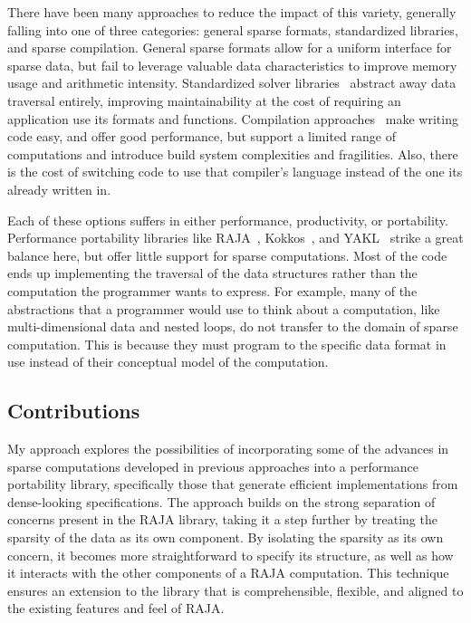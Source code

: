 There have been many approaches to reduce the impact of this variety, generally falling into one of three categories: general sparse formats, standardized libraries, and sparse compilation.
General sparse formats allow for a uniform interface for sparse data, but fail to leverage valuable data characteristics to improve memory usage and arithmetic intensity.
Standardized solver libraries~\cite{eisenstat1977yale,eisenstat1977yale2,eisenstat1984new,kincaid1982algorithm,chu1980user,george1984new,marsten1981design,saad1990sparskit,falgout2006design} abstract away data traversal entirely, improving maintainability at the cost of requiring an application use its formats and functions.
Compilation approaches~\cite{ahmed2000compiling,ahmed2000framework,bik1993automatic,bik1996automatic,bik2022compiler} make writing code easy, and offer good performance, but support a limited range of computations and introduce build system complexities and fragilities.
Also, there is the cost of switching code to use that compiler's language instead of the one its already written in.

Each of these options suffers in either performance, productivity, or portability.
Performance portability libraries like RAJA~\cite{hornung2014RAJA}, Kokkos~\cite{edwards2014kokkos}, and YAKL~\cite{norman2022portable} strike a great balance here, but offer little support for sparse computations.
Most of the code ends up implementing the traversal of the data structures rather than the computation the programmer wants to express.
For example, many of the abstractions that a programmer would use to think about a computation, like multi-dimensional data and nested loops, do not transfer to the domain of sparse computation.
This is because they must program to the specific data format in use instead of their conceptual model of the computation.


\subsection{Contributions}

My approach explores the possibilities of incorporating some of the advances in sparse computations developed in previous approaches into a performance portability library, specifically those that generate efficient implementations from dense-looking specifications.
The approach builds on the strong separation of concerns present in the RAJA library, taking it a step further by treating the sparsity of the data as its own component.
By isolating the sparsity as its own concern, it becomes more straightforward to specify its structure, as well as how it interacts with the other components of a RAJA computation.
This technique ensures an extension to the library that is comprehensible, flexible, and aligned to the existing features and feel of RAJA\@.

